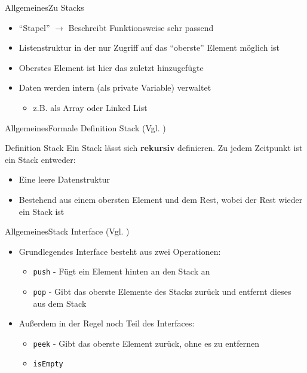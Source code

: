 \begin{frame}{Allgemeines}{Zu Stacks}
	\begin{itemize}
		\item "`Stapel"' $\rightarrow$ Beschreibt Funktionsweise sehr passend
		\item Listenstruktur in der nur Zugriff auf das "`oberste"' Element möglich ist
		\item Oberstes Element ist hier das zuletzt hinzugefügte
		\item Daten werden intern (als private Variable) verwaltet
		\begin{itemize}
			\item z.B. als Array oder Linked List
		\end{itemize}
	\end{itemize}
\end{frame}

\begin{frame}{Allgemeines}{Formale Definition Stack (Vgl. \cite{fahr:list})}
	\begin{alertblock}{Definition Stack}
	Ein Stack lässt sich \textbf{rekursiv} definieren. Zu jedem Zeitpunkt ist ein Stack entweder:
	\begin{itemize}
		\item Eine leere Datenstruktur
		\item Bestehend aus einem obersten Element und dem Rest, wobei der Rest wieder ein Stack ist
	\end{itemize}
	\end{alertblock}
\end{frame}

\begin{frame}{Allgemeines}{Stack Interface (Vgl. \cite{stacksqueues})}
	\begin{itemize}
		\item Grundlegendes Interface besteht aus zwei Operationen:
		\begin{itemize}
			\item \texttt{push} - Fügt ein Element hinten an den Stack an
			\item \texttt{pop} - Gibt das oberste Elemente des Stacks zurück und entfernt dieses aus dem Stack
		\end{itemize}
		\item Außerdem in der Regel noch Teil des Interfaces:
		\begin{itemize}
			\item \texttt{peek} - Gibt das oberste Element zurück, ohne es zu entfernen
			\item \texttt{isEmpty}
		\end{itemize}
	\end{itemize}
\end{frame}

